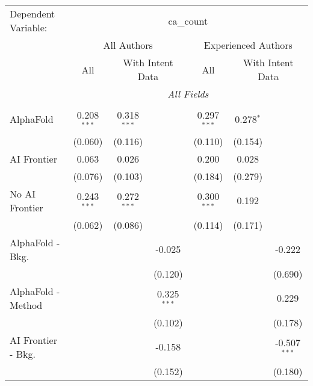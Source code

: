 \begingroup
\centering
\begin{tabular}{lcccccc}
   \tabularnewline \midrule \midrule
   Dependent Variable: & \multicolumn{6}{c}{ca\_count}\\
 & \multicolumn{3}{c}{All Authors} & \multicolumn{3}{c}{Experienced Authors} \\
\cmidrule(lr){2-4} \cmidrule(lr){5-7}
 & \multicolumn{1}{c}{All} & \multicolumn{2}{c}{With Intent Data} & \multicolumn{1}{c}{All} & \multicolumn{2}{c}{With Intent Data} \\
\cmidrule(lr){2-2} \cmidrule(lr){3-4} \cmidrule(lr){5-5} \cmidrule(lr){6-7}
 & \multicolumn{6}{c}{\textit{All Fields}} \\ \\
   AlphaFold               & 0.208$^{***}$ & 0.318$^{***}$ &               & 0.297$^{***}$ & 0.278$^{*}$ &   \\   
                           & (0.060)       & (0.116)       &               & (0.110)       & (0.154)     &   \\   
   AI Frontier             & 0.063         & 0.026         &               & 0.200         & 0.028       &   \\   
                           & (0.076)       & (0.103)       &               & (0.184)       & (0.279)     &   \\   
   No AI Frontier          & 0.243$^{***}$ & 0.272$^{***}$ &               & 0.300$^{***}$ & 0.192       &   \\   
                           & (0.062)       & (0.086)       &               & (0.114)       & (0.171)     &   \\   
   AlphaFold - Bkg.        &               &               & -0.025        &               &             & -0.222\\   
                           &               &               & (0.120)       &               &             & (0.690)\\   
   AlphaFold - Method      &               &               & 0.325$^{***}$ &               &             & 0.229\\   
                           &               &               & (0.102)       &               &             & (0.178)\\   
   AI Frontier - Bkg.      &               &               & -0.158        &               &             & -0.507$^{***}$\\   
                           &               &               & (0.152)       &               &             & (0.180)\\   

\end{tabular}
